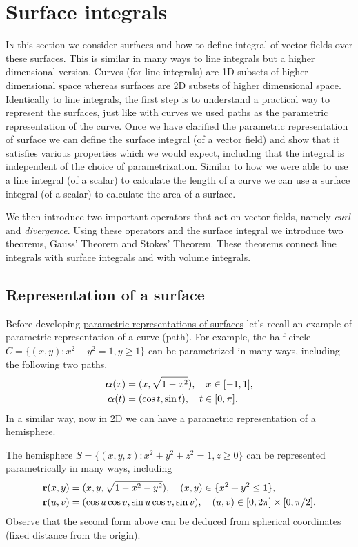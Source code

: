 \chapter{Surface integrals}

\lettrine{I}{n} this section we consider surfaces and how to define integral of vector fields over these surfaces.
This is similar in many ways to line integrals but a higher dimensional version.
Curves (for line integrals) are 1D subsets of higher dimensional space whereas surfaces are 2D subsets of higher dimensional space.
Identically to line integrals, the first step is to understand a practical way to represent the surfaces, just like with curves we used paths as the parametric representation of the curve.
Once we have clarified the parametric representation of surface we can define the surface integral (of a vector field) and show that it satisfies various properties which we would expect, including that the integral is independent of the choice of parametrization.
Similar to how we were able to use a line integral (of a scalar) to calculate the length of a curve we can use a surface integral (of a scalar) to calculate the area of a surface.

We then introduce two important operators that act on vector fields, namely \emph{curl} and \emph{divergence}.
Using these operators and the surface integral we introduce two theorems, Gauss' Theorem and Stokes' Theorem.
These theorems connect line integrals with surface integrals and with volume integrals.

\section{Representation of a surface}

Before developing \href{https://en.wikipedia.org/wiki/Parametric_surface}{parametric representations of surfaces} let's recall an example of parametric representation of a curve (path).
For example, the half circle \(C=\{(x,y): x^2 + y^2=1, y\geq 1\}\) can be parametrized in many ways, including the following two paths.
\[
    \begin{aligned}
        \boldsymbol{\alpha}(x) & = (x,\sqrt{1-x^2}), \quad x\in [-1,1],  \\
        \boldsymbol{\alpha}(t) & = (\cos t, \sin t), \quad t\in [0,\pi].
    \end{aligned}
\]
In a similar way, now in 2D we can have a parametric representation of a hemisphere.
\begin{example*}[hemisphere]
    The hemisphere \(S = \{(x,y,z): x^2+y^2+z^2=1, z\geq 0\}\) can be represented parametrically in many ways, including
    \[
        \begin{aligned}
            \mathbf{r}(x,y) & =(x,y,{\sqrt{1-x^2 -y^2}}), \quad (x,y)\in\{x^2+y^2 \leq 1\},                             \\
            \mathbf{r}(u,v) & =({\cos u \cos v}, {\sin u \cos v}, {\sin v}), \quad (u,v)\in  [0,2\pi] \times [0,\pi/2].
        \end{aligned}
    \]
    Observe that the second form above can be deduced from spherical coordinates (fixed distance from the origin).
\end{example*}

